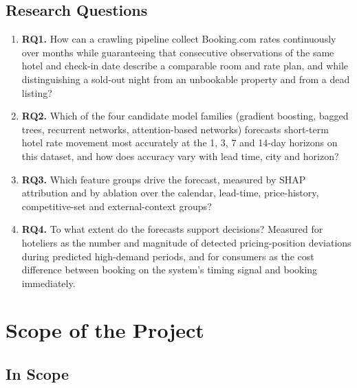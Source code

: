 \subsection{Research Questions}

\begin{enumerate}[leftmargin=*]
    \item \textbf{RQ1.} How can a crawling pipeline collect Booking.com rates continuously over months while guaranteeing that consecutive observations of the same hotel and check-in date describe a comparable room and rate plan, and while distinguishing a sold-out night from an unbookable property and from a dead listing?

    \item \textbf{RQ2.} Which of the four candidate model families (gradient boosting, bagged trees, recurrent networks, attention-based networks) forecasts short-term hotel rate movement most accurately at the 1, 3, 7 and 14-day horizons on this dataset, and how does accuracy vary with lead time, city and horizon?

    \item \textbf{RQ3.} Which feature groups drive the forecast, measured by SHAP attribution and by ablation over the calendar, lead-time, price-history, competitive-set and external-context groups?

    \item \textbf{RQ4.} To what extent do the forecasts support decisions? Measured for hoteliers as the number and magnitude of detected pricing-position deviations during predicted high-demand periods, and for consumers as the cost difference between booking on the system's timing signal and booking immediately.
\end{enumerate}

\section{Scope of the Project}

\subsection{In Scope}

